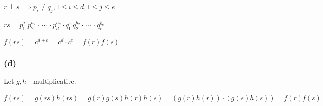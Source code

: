\documentclass{article}
\begin{document}
\( r \perp s \implies p_i \neq q_j, 1 \leq i \leq d, 1 \leq j \leq e \)

\( rs = p_1^{a_1} p_2^{a_2} \cdot\ \cdots\ \cdot p_d^{a_d} \cdot q_1^{b_1} q_2^{b_2} \cdot\ \cdots\ \cdot q_e^{b_e} \)

\( f(rs) = c^{d+e} = c^d \cdot c^e = f(r)f(s) \)

\subsubsection*{(d)}

Let \( g,h \) - multiplicative.

\( f(rs) = g(rs)h(rs) = g(r)g(s)h(r)h(s) = (g(r)h(r))\cdot(g(s)h(s)) = f(r)f(s) \)
\end{document}
